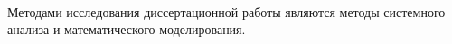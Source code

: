 


\methodology\ %


Методами исследования диссертационной работы являются методы системного анализа и математического моделирования. 



